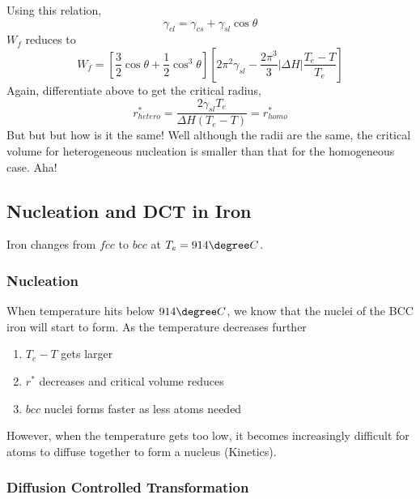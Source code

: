 Using this relation,
\begin{equation}
  \gamma_{cl} = \gamma_{cs} + \gamma_{sl}\cos\theta
\end{equation}
$W_f$ reduces to
\begin{equation}
  W_f = \left[\frac{3}{2}\cos\theta+\frac{1}{2}\cos^3\theta\right]\left[2\pi^2\gamma_{sl} - \frac{2\pi^3}{3}|\Delta H| \frac{T_e-T}{T_e}\right]
\end{equation}
Again, differentiate above to get the critical radius,
\begin{equation}
  r^*_{hetero} = \frac{2\gamma_{sl}T_e}{\Delta H (T_e - T)} = r^*_{homo}
\end{equation}
But but but how is it the same! Well although the radii are the same, the critical volume for heterogeneous nucleation is smaller than that for the homogeneous case. Aha!

\subsection{Nucleation and DCT in Iron} %
\label{sub:nucleation_and_dct_in_iron}

Iron changes from $fcc$ to $bcc$ at $T_e = 914\degree C$.

\subsubsection{Nucleation}


When temperature hits below $914\degree C$, we know that the nuclei of the BCC iron will start to form. As the temperature decreases further
\begin{enumerate}
   \item $T_e - T$ gets larger
   \item $r^*$ decreases and critical volume reduces
   \item $bcc$ nuclei forms faster as less atoms needed
 \end{enumerate}

 However, when the temperature gets too low, it becomes increasingly difficult for atoms to diffuse together to form a nucleus (Kinetics).

\subsubsection{Diffusion Controlled Transformation}

